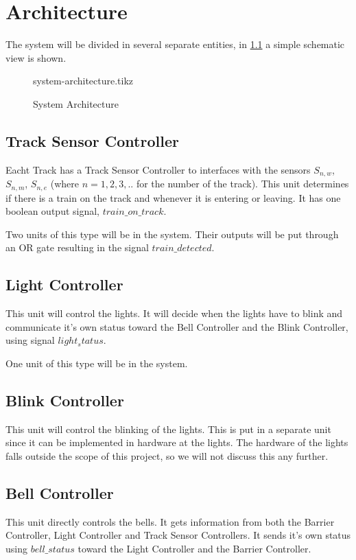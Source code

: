 \documentclass[final]{report}
\begin{document}
\chapter{Architecture}
The system will be divided in several separate entities, in \cref{fig:system-architecture} a simple schematic view is shown.

\begin{figure}[H]
	\centering
	{system-architecture.tikz}
	\caption{System Architecture}
	\label{fig:system-architecture}
\end{figure}

\section{Track Sensor Controller}
Eacht Track has a Track Sensor Controller to interfaces with the sensors $S_{n,w}$, $S_{n,m}$, $S_{n,e}$ (where $n = 1,2,3,..$ for the number of the track).
This unit determines if there is a train on the track and whenever it is entering or leaving.
It has one boolean output signal, $train\_on\_track$.

Two units of this type will be in the system.
Their outputs will be put through an OR gate resulting in the signal $train\_detected$.

\section{Light Controller}
This unit will control the lights.
It will decide when the lights have to blink and communicate it's own status toward the Bell Controller and the Blink Controller, using signal $light_status$.

One unit of this type will be in the system.

\section{Blink Controller}
This unit will control the blinking of the lights.
This is put in a separate unit since it can be implemented in hardware at the lights.
The hardware of the lights falls outside the scope of this project, so we will not discuss this any further.

\section{Bell Controller}
This unit directly controls the bells.
It gets information from both the Barrier Controller, Light Controller and Track Sensor Controllers.
It sends it's own status using $bell\_status$ toward the Light Controller and the Barrier Controller.
\end{document}
